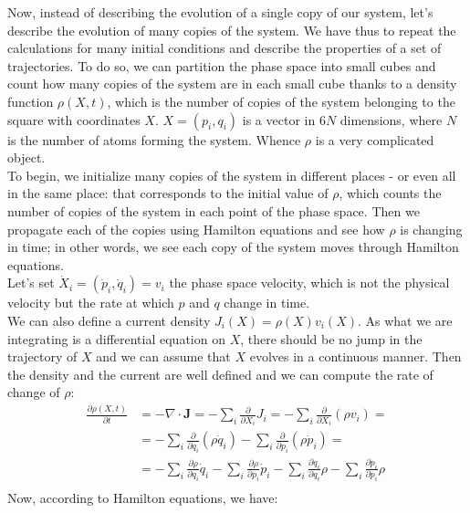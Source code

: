    Now, instead of describing the evolution of a single copy of our system, let's describe the evolution of many copies of the system. We have thus to repeat the calculations for many initial conditions and describe the properties of a set of trajectories. To do so, we can partition the phase space into small cubes and count how many copies of the system are in each small cube thanks to a density function $\rho(X,t)$, which is the number of copies of the system belonging to the square with coordinates $X$. $X=(p_i,q_i)$ is a vector in $6N$ dimensions, where $N$ is the number of atoms forming the system. Whence $\rho$ is a very complicated object.
    \\To begin, we initialize many copies of the system in different places - or even all in the same place: that corresponds to the initial value of $\rho$, which counts the number of copies of the system in each point of the phase space. Then we propagate each of the copies using Hamilton equations and see how $\rho$ is changing in time; in other words, we see each copy of the system moves through Hamilton equations.
    \\Let's set $\dot{X}_i=(\dot{p}_i,\dot{q}_i)=v_i$ the phase space velocity, which is not the physical velocity but the rate at which $p$ and $q$ change in time.
    \\We can also define a current density  $J_i(X)=\rho(X) v_i(X)$. As what we are integrating is a differential equation on $X$, there should be no jump in the trajectory of $X$ and we can assume that $X$ evolves in a continuous manner. Then the density and the current are well defined and we can compute the rate of change of $\rho$:
    \begin{equation}
    \begin{aligned}
        \frac{\partial \rho (X,t)}{\partial t}&=-\nabla \cdot \mathbf{J}=-\sum_i\frac{\partial}{\partial X_i}J_i=-\sum_i\frac{\partial}{\partial X_i}(\rho v_i)=\\
        &=-\sum_i\frac{\partial}{\partial q_i}(\rho \dot{q}_i)-\sum_i\frac{\partial}{\partial p_i}(\rho \dot{p}_i)=\\
        &=-\sum_i\frac{\partial \rho}{\partial q_i}\dot{q}_i-\sum_i\frac{\partial \rho}{\partial p_i}\dot{p}_i-\sum_i\frac{\partial \dot{q}_i}{\partial q_i}\rho-\sum_i\frac{\partial \dot{p}_i}{\partial p_i}\rho\\
    \end{aligned}
    \end{equation}
    Now, according to Hamilton equations, we have:
